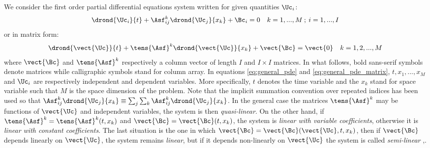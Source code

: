 
We consider the first order partial differential equations system written for given quantities $\Uc_i$:
\begin{equation}
  \label{eq:general_pde}
  \drond{\Uc_i}{t} + \Asf^k_{ij}\drond{\Uc_j}{x_k} + \Bc_i= 0 \quad k=1,...,M \:;\: i=1,...,I
\end{equation}
or in matrix form:
\begin{equation}
  \label{eq:general_pde_matrix}
  \drond{\vect{\Uc}}{t} + \tens{\Asf}^k \drond{\vect{\Uc}}{x_k} + \vect{\Bc} = \vect{0}\quad k=1,2,...,M
\end{equation}
where $\vect{\Bc}$ and $\tens{\Asf}^k$ respectively a column vector of length $I$ and $I\times I$ matrices. In what follows, bold sans-serif symbols denote matrices while calligraphic symbols stand for column array. In equations \ref{eq:general_pde} and \ref{eq:general_pde_matrix}, $t,x_1,...,x_M$ and $\Uc_i$ are respectively independent and dependent variables. More specifically, $t$ denotes the time variable and the $x_k$ stand for space variable such that $M$ is the space dimension of the problem. Note that the implicit summation convention over repeated indices has been used so that $\Asf^k_{ij}\drond{\Uc_j}{x_k} \equiv \sum_{j}\sum_{k} \Asf^k_{ij}\drond{\Uc_j}{x_k}$. In the general case the matrices $\tens{\Asf}^k$ may be functions of $\vect{\Uc}$ and independent variables, the system is then \textit{quasi-linear}. On the other hand, if $\tens{\Asf}^k=\tens{\Asf}^k(t,x_k)$ and $\vect{\Bc}=\vect{\Bc}(t,x_k)$, the system is \textit{linear with variable coefficients}, otherwise it is \textit{linear with constant coefficients}. The last situation is the one in which $\vect{\Bc}=\vect{\Bc}(\vect{\Uc},t,x_k)$, then if $\vect{\Bc}$ depends linearly on $\vect{\Uc}$, the system remains \textit{linear}, but if it depends non-linearly on $\vect{\Uc}$ the system is called \textit{semi-linear} \cite[Chapter~5]{Courant},\cite[Chapter~2]{Toro}.

